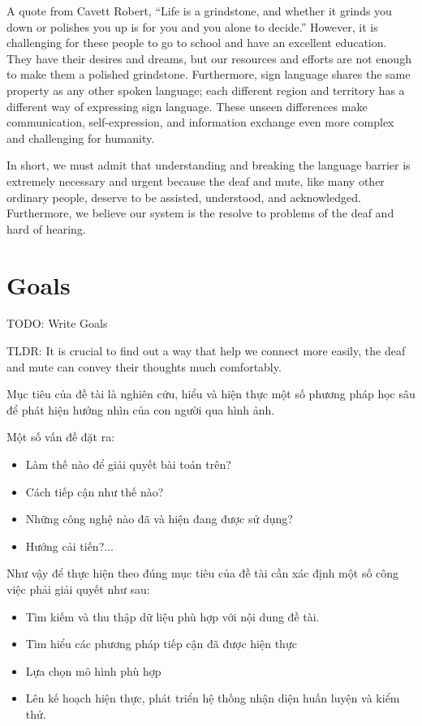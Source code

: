 A quote from Cavett Robert, “Life is a grindstone, and whether it grinds you down or polishes you up is for you and you alone to decide.” However, it is challenging for these people to go to school and have an excellent education. They have their desires and dreams, but our resources and efforts are not enough to make them a polished grindstone. Furthermore, sign language shares the same property as any other spoken language; each different region and territory has a different way of expressing sign language. These unseen differences make communication, self-expression, and information exchange even more complex and challenging for humanity.

In short, we must admit that understanding and breaking the language barrier is extremely necessary and urgent because the deaf and mute, like many other ordinary people, deserve to be assisted, understood, and acknowledged. Furthermore, we believe our system is the resolve to problems of the deaf and hard of hearing.

\section{Goals}

TODO: Write Goals

TLDR: It is crucial to find out a way that help we connect more easily, the deaf and mute can convey their thoughts much comfortably.

Mục tiêu của đề tài là nghiên cứu, hiểu và hiện thực một số phương pháp học sâu để phát hiện hướng nhìn của con người qua hình ảnh.

Một số vấn đề đặt ra: 
\begin{itemize}
  \item Làm thế nào để giải quyết bài toán trên?
  \item Cách tiếp cận như thế nào?
  \item Những công nghệ nào đã và hiện đang được sử dụng?
  \item Hướng cải tiến?...
\end{itemize}

Như vậy để thực hiện theo đúng mục tiêu của đề tài cần xác định một số công việc phải giải quyết như sau:
\begin{itemize}
  \item Tìm kiếm và thu thập dữ liệu phù hợp với nội dung đề tài.
  \item Tìm hiểu các phương pháp tiếp cận đã được hiện thực
  \item Lựa chọn mô hình phù hợp
  \item Lên kế hoạch hiện thực, phát triển hệ thống nhận diện huấn luyện và kiểm thử.
\end{itemize}


